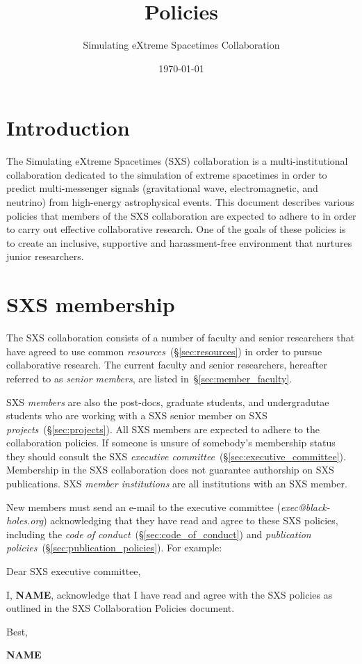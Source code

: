 \documentclass[12pt]{article}
\author{Simulating eXtreme Spacetimes Collaboration}
\date{\today}
\title{Policies}
\begin{document}
\maketitle
\section{Introduction}

The Simulating eXtreme Spacetimes (SXS) collaboration is a
multi-institutional collaboration dedicated to the simulation of
extreme spacetimes in order to predict multi-messenger signals
(gravitational wave, electromagnetic, and neutrino) from high-energy
astrophysical events.  This document describes various policies that
members of the SXS collaboration are expected to adhere to in order to
carry out effective collaborative research.  One of the goals of these
policies is to create an inclusive, supportive and harassment-free
environment that nurtures junior researchers.

\section{SXS membership}\label{sec:sxs_membership}

The SXS collaboration consists of a number of faculty and senior
researchers that have agreed to use common
\emph{resources}~(\S\ref{sec:resources}) in order to pursue
collaborative research.  The current faculty and senior researchers,
hereafter referred to as \emph{senior members}, are listed
in~\S\ref{sec:member_faculty}.

SXS \emph{members} are also the post-docs, graduate students, and
undergradutae students who are working with a SXS senior member on SXS
\emph{projects}~(\S\ref{sec:projects}).  All SXS members are expected
to adhere to the collaboration policies.  If someone is unsure of
somebody's membership status they should consult the SXS
\emph{executive committee}~(\S\ref{sec:executive_committee}).
Membership in the SXS collaboration does not guarantee authorship on
SXS publications.  SXS \emph{member institutions} are all institutions
with an SXS member.

New members must send an e-mail to the executive committee
(\emph{exec@black-holes.org}) acknowledging that they have read and
agree to these SXS policies, including the \emph{code of
  conduct}~(\S\ref{sec:code_of_conduct}) and \emph{publication
  policies}~(\S\ref{sec:publication_policies}).  For example:

\begin{displayquote}
  Dear SXS executive committee,

  I, \textbf{NAME}, acknowledge that I have read and agree with the
  SXS policies as outlined in the SXS Collaboration Policies
  document.

  Best,

  \textbf{NAME}
\end{displayquote}
\end{document}
